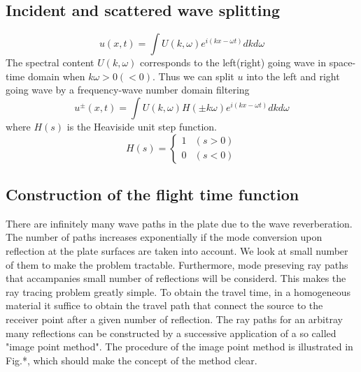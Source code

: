 ﻿\documentclass[11pt,a4j]{article}
\begin{document}
\subsection{Incident and scattered wave splitting}
\begin{equation}
	u(x,t)=\int U(k,\omega) e^{i(kx-\omega t)} dkd\omega
	\label{eqn:}
\end{equation}
The spectral content $U(k,\omega)$ corresponds to the 
left(right) going wave in space-time domain when $k\omega >0 (<0)$. 
Thus we can split $u$ into the left and right going wave by 
a frequency-wave number domain filtering 
\begin{equation}
	u^{\pm}(x,t)=\int U(k,\omega)H(\pm k\omega) e^{i(kx-\omega t)} dkd\omega
	\label{eqn:}
\end{equation}
where $H(s)$ is the Heaviside unit step function.
\begin{equation}
	H(s)=\left\{
	\begin{array}{cc}
		1 & (s >0) \\
		0 & (s <0)
	\end{array}
	\right.
	\label{eqn:}
\end{equation}
\subsection{Construction of the flight time function}
There are infinitely many wave paths in the plate due to the wave reverberation.
The number of paths increases exponentially if the mode conversion upon reflection 
at the plate surfaces are taken into account.
We look at small number of them to make the problem tractable.
Furthermore, mode preseving ray paths that accampanies small number of reflections 
 will be considerd. 
 This makes the ray tracing problem greatly simple. 
 To obtain the travel time, in a homogeneous material it suffice to 
 obtain the travel path that connect the source to the receiver point 
 after a given number of reflection.
 The ray paths for an arbitray many reflections can be constructed by 
 a successive application of a so called "image point method".
The procedure of the image point method is illustrated in Fig.*, which should make 
the concept of the method clear.
\end{document}
